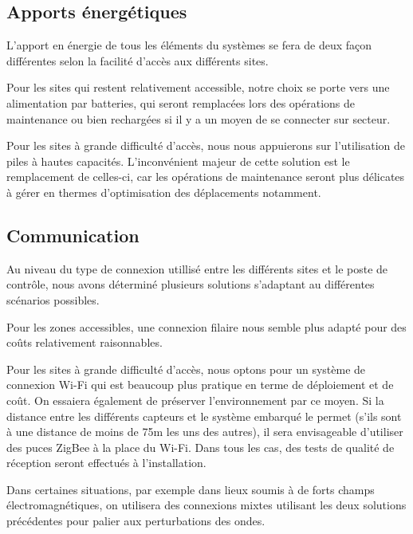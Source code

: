 \documentclass{mise_en_page}
\begin{document}
\subsection{Apports énergétiques}
L’apport en énergie de tous les éléments du systèmes se fera de deux
façon différentes selon la facilité d’accès aux différents sites.

Pour les sites qui restent relativement accessible, notre choix se porte
vers une alimentation par batteries, qui seront remplacées lors des
opérations de maintenance ou bien rechargées si il y a un moyen de se
connecter sur secteur.

Pour les sites à grande difficulté d’accès, nous nous appuierons sur
l’utilisation de piles à hautes capacités. L’inconvénient majeur de
cette solution est le remplacement de celles-ci, car les opérations de
maintenance seront plus délicates à gérer en thermes d’optimisation 
des déplacements notamment.

\subsection{Communication}
Au niveau du type de connexion utillisé entre les différents sites et le
poste de contrôle, nous avons déterminé plusieurs solutions s’adaptant
au différentes scénarios possibles.

Pour les zones accessibles, une connexion filaire nous semble plus
adapté pour des coûts relativement raisonnables.

Pour les sites à grande difficulté d’accès, nous optons pour un système
de connexion Wi-Fi qui est beaucoup plus pratique en terme de
déploiement et de coût. On essaiera également de préserver
l’environnement par ce moyen. Si la distance entre les différents
capteurs et le système embarqué le permet (s’ils sont à une distance de
moins de 75m les uns des autres), il sera envisageable d’utiliser des
puces ZigBee à la place du Wi-Fi. Dans tous les cas, des tests de
qualité de réception seront effectués à l’installation.

Dans certaines situations, par exemple dans lieux soumis à de forts
champs électromagnétiques, on utilisera des connexions mixtes utilisant
les deux solutions précédentes pour palier aux perturbations des ondes.
\end{document}
